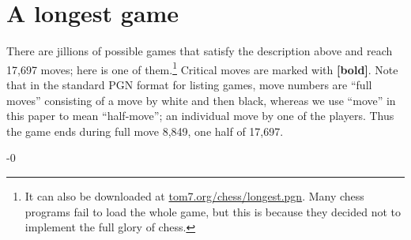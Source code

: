 \documentclass[twocolumn]{article}
\begin{document}
\section{A longest game} \label{sec:longest}

There are jillions of possible games that satisfy the description
above and reach 17,697 moves; here is one of them.\footnote{
  It can also be downloaded at \url{tom7.org/chess/longest.pgn}.
  Many chess programs fail to load the whole game, but this is
  because they decided not to implement the full glory of chess.}
%
Critical moves are marked with {\large \bf [bold]}. Note that in the
standard PGN format for listing games, move numbers are ``full moves''
consisting of a move by white and then black, whereas we use ``move''
in this paper to mean ``half-move''; an individual move by one of the
players. Thus the game ends during full move 8,849, one half of
17,697.

\medskip

\begin{sloppypar}
\tiny
{}

\noindent 
{}-0

\end{sloppypar}

\nocite{chesstego}

{}

\end{document}
